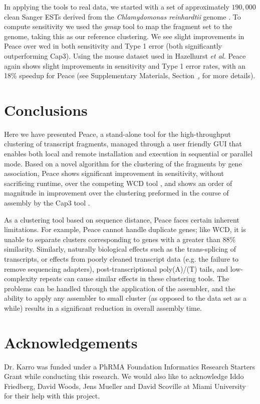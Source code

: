 \documentclass[a4,center,fleqn]{NAR}
\begin{document}
In applying the tools to real data, we started with a set of
approximately $190,000$ clean Sanger ESTs derived from the {\it
  Chlamydomonas reinhardtii} genome \cite{Liang2008}.  To compute
sensitivity we used the {\it gmap} tool \cite{Wu05} to map the
fragment set to the genome, taking this as our reference clustering.
We see slight improvements in {\sc Peace} over {\sc wcd} in both
sensitivity and Type 1 error (both significantly outperforming {\sc
  Cap3}).  Using the mouse dataset used in Hazelhurst {\it et
  al.}  \cite{Hazelhurst08a} {\sc Peace} again shows slight
improvements in sensitivity and Type 1 error rates, with an 18\% speedup
for {\sc Peace} (see Supplementary Materials,
Section~\href{real_results}, for more details).

\section{Conclusions}

Here we have presented {\sc Peace}, a stand-alone tool for the
high-throughput clustering of transcript fragments, managed through a
user friendly GUI that enables both local and remote installation and
execution in sequential or parallel mode.  Based on a novel algorithm
for the clustering of the fragments by gene association, {\sc Peace}
shows significant improvement in sensitivity, without sacrificing runtime,
over the competing {\sc WCD} tool \cite{Hazelhurst08a}, and shows an
order of magnitude in improvement over the clustering preformed in the
course of assembly by the {\sc Cap3} tool \cite{Huang99}.

As a clustering tool based on sequence distance, {\sc Peace} faces
certain inherent limitations. For example, {\sc Peace} cannot handle
duplicate genes; like {\sc WCD}, it is unable to separate clusters
corresponding to genes with a greater than 88\% similarity.
Similarly, naturally biological effects such as the trans-splicing of
transcripts, or effects from poorly cleaned transcript data (e.g. the
failure to remove sequencing adapters), post-transcriptional
poly(A)/(T) tails, and low-complexity repeats can cause similar
effects in these clustering tools.  The problems can be handled
through the application of the assembler, and the ability to apply any
assembler to small cluster (as opposed to the data set as a while)
results in a significant reduction in overall assembly time.

\section{Acknowledgements}

Dr. Karro was funded under a PhRMA Foundation Informatics Research
Starters Grant while conducting this research.  We would also like to
acknowledge Iddo Friedberg, David Woods, Jens Mueller and David
Scoville at Miami University for their help with this project.

\vspace{3mm}


\end{document}

